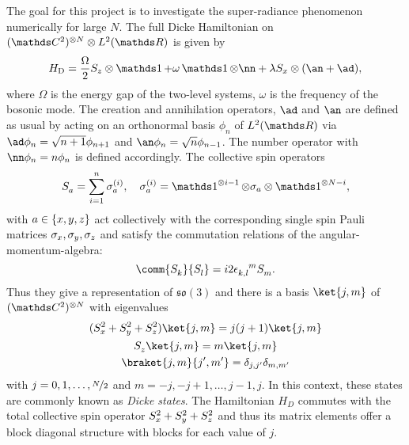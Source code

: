 The goal for this project is to investigate the super-radiance phenomenon numerically for large \(N\).
The full Dicke Hamiltonian on \((\C^2)^{\otimes N} \otimes \Ltwo{\R}\) is given by
\begin{equation}\label{eq:dicke-hamiltonian}
    H_{\mathrm{D}} = \frac{\Omega}{2} \SZ \otimes \one + \omega \one \otimes \nn + \lambda \SX \otimes \of*{\an + \ad}
    ,
\end{equation}
where \(\Omega\) is the energy gap of the two-level systems, \(\omega\) is the frequency of the bosonic mode.
The creation and annihilation operators, \(\ad\) and \(\an\) are defined as usual by acting on an orthonormal basis \(\phi_n\) of \(\Ltwo{\R}\) via \(\ad\phi_n = \sqrt{n+1} \phi_{n+1}\) and \(\an\phi_n = \sqrt{n}\phi_{n-1}\).
The number operator with \(\nn \phi_n = n \phi_n\) is defined accordingly.
The collective spin operators 
\begin{gather}
	\s{}_{a} = \sum_{i = 1}^n \pauliI{a}{i}, \quad \pauliI{a}{i} = \one^{\otimes i-1}\otimes \pauli{a}\otimes \one^{\otimes N-i}
    ,
\end{gather}
with \(a \in \{x,y,z\}\) act collectively with the corresponding single spin Pauli matrices \(\sigma_{x},\sigma_{y},\sigma_{z}\) and satisfy the commutation relations of the angular-momentum-algebra:
\begin{equation}\label{eq:angular-momentum-algebra}
	\comm{\s{}_k}{\s{}_l} = i2\tensor{\epsilon}{_{k,l}^{m}}\s{}_m
    .
\end{equation}
Thus they give a representation of \(\mathfrak{so}(3)\) and there is a basis \(\ket{j,m}\) of \((\C^2)^{\otimes N}\) with eigenvalues
\begin{gather}
	\label{eq:dicke-states-total-spin}
	(\SX^2 + \SY^2 + \SZ^2)\ket{j,m} = j(j+1)\ket{j,m}
	\\
	\label{eq:dicke-states-magnetic-number}
	\s{}_z\ket{j,m} = m\ket{j,m}
	\\
	\label{eq:dicke-states-orthonormal}
	\braket{j,m}{j\primed,m\primed} = \delta_{j,j\primed}\delta_{m,m\primed}
\end{gather}
with \(j = 0,1,\dots, \nicefrac{N}{2}\) and \(m = -j,-j+1, \dots,j-1, j\).
In this context, these states are commonly known as \emph{Dicke states}.
The Hamiltonian \(H_D\) commutes with the total collective spin operator \(S_x^2 + S_y^2 + S_z^2\) and thus its matrix elements offer a block diagonal structure with blocks for each value of \(j\).



